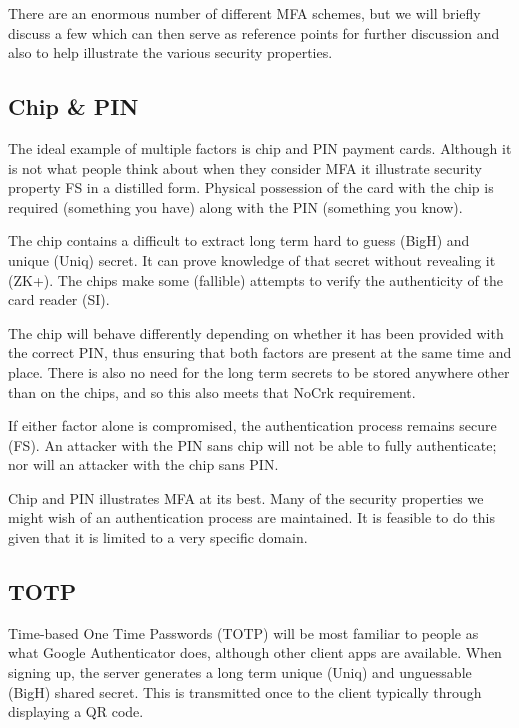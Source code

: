 \documentclass{soups}
\newcommand{\prop}[1]{\textsf{#1}}
\begin{document}
There are an enormous number of different MFA schemes,
but we will briefly discuss a few
which can then serve as reference points for further discussion and also to help illustrate the various security properties.

\subsection{Chip \& PIN}

The ideal example of multiple factors is chip and PIN payment cards. Although it is not what people think about when they consider MFA it illustrate security property \prop{FS} in a distilled form.
Physical possession of the card with the chip is required (something you have) along with the PIN (something you know).

The chip contains a difficult to extract long term hard to guess (\prop{BigH}) and unique (\prop{Uniq}) secret. It can prove knowledge of that secret without revealing it (\prop{ZK+}). The chips make some (fallible) attempts to verify the authenticity of the card reader (\prop{SI}).

The chip will behave differently depending on whether it has been provided with the correct PIN, thus ensuring that both factors are present at the same time and place. There is also no need for the long term secrets to be stored anywhere other than on the chips, and so this also meets that \prop{NoCrk} requirement.

If either factor alone is compromised, the authentication process remains secure (\prop{FS}).
An attacker with the PIN sans chip will not be able to fully authenticate; nor will an attacker with the chip sans PIN\@.


Chip and PIN illustrates MFA at its best. Many of the security properties we might wish of an authentication process are maintained. It is feasible to do this given that it is limited to a very specific domain.

\subsection{TOTP}\label{sec:totp}

Time-based One Time Passwords (TOTP) will be most familiar to people as what Google Authenticator does, although other client apps are available.
When signing up, the server generates a long term unique (\prop{Uniq}) and unguessable (\prop{BigH}) shared secret. This is transmitted once to the client typically through displaying a QR code. 
\end{document}
